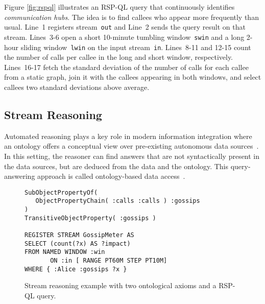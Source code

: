 Figure \ref{fig:rspql} illustrates an RSP-QL query that continuously
identifies \textit{communication hubs}. The idea is to find callees
who appear more frequently than usual. Line~1 registers stream~\lstinline{out} and Line~2 sends
the query result on that stream. \mbox{Lines 3-6} open a short
10-minute tumbling window~\lstinline{swin} and a long \mbox{2-hour}
sliding window~\lstinline{lwin} on the input
stream~\lstinline{in}. \mbox{Lines 8-11} and \mbox{12-15} count the
number of calls per callee in the long and short window,
respectively. \mbox{Lines 16-17} fetch the standard deviation of the
number of calls for each callee from a static graph, join it with the
callees appearing in both windows, and select callees two
standard deviations above average.

\subsection{Stream Reasoning}\label{sec:sr} %

Automated reasoning plays a key role in modern information integration where an ontology offers a conceptual view over
pre-existing autonomous data sources~\cite{DBLP:conf/pods/Lenzerini02}. In this setting, the reasoner
can find answers that are not syntactically present in the data
sources, but are deduced from the data and the ontology.  This
query-answering approach is called ontology-based data
access~\cite{DBLP:journals/jods/PoggiLCGLR08}.

\begin{figure}[!t]
\begin{lstlisting}[language=rsp-ql]
SubObjectPropertyOf(
   ObjectPropertyChain( :calls :calls ) :gossips
)
TransitiveObjectProperty( :gossips )

REGISTER STREAM GossipMeter AS
SELECT (count(?x) AS ?impact)
FROM NAMED WINDOW :win
       ON :in [ RANGE PT60M STEP PT10M]
WHERE { :Alice :gossips ?x }
\end{lstlisting}
\vspace*{-5mm}
\caption{\label{fig:sr}Stream reasoning example with two ontological axioms and a RSP-QL query.}
\vspace*{-4mm}
\end{figure}

